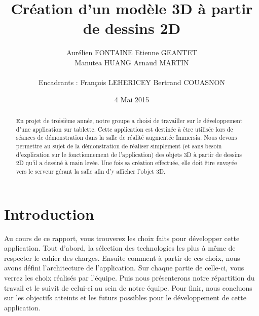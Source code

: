 \documentclass[a4paper,11pt]{article}
\title{ \textbf{Création d'un modèle 3D à partir de dessins 2D} }
\author{ Aurélien \textsc{FONTAINE} Etienne \textsc{GEANTET} \\
	Manutea \textsc{HUANG} Arnaud \textsc{MARTIN} \\
	\\
	Encadrants : François \textsc{LEHERICEY}	Bertrand \textsc{COUASNON}}
\date{4 Mai 2015}                    %
\begin{document}
\maketitle                 %
\thispagestyle{empty}      %

\begin{abstract}
	En projet de troisième année, notre groupe a choisi de travailler sur le développement d'une application sur tablette. Cette application est destinée à être utilisée lors de séances de démonstration dans la salle de réalité augmentée Immersia. Nous devons permettre au sujet de la démonstration de réaliser simplement (et sans besoin d'explication sur le fonctionnement de l'application) des objets 3D à partir de dessins 2D qu'il a dessiné à main levée. Une fois sa création effectuée, elle doit être envoyée vers le serveur gérant la salle afin d'y afficher l'objet 3D.
\end{abstract}
	
	\section{Introduction} %
		Au cours de ce rapport, vous trouverez les choix faits pour développer cette application. Tout d'abord, la sélection des technologies les plus à même de respecter le cahier des charges. Ensuite comment à partir de ces choix, nous avons défini l'architecture de l'application. Sur chaque partie de celle-ci, vous verrez les choix réalisés par l'équipe. Puis nous présenterons notre répartition du travail et le suivit de celui-ci au sein de notre équipe. Pour finir, nous concluons sur les objectifs atteints et les futurs possibles pour le développement de cette application.
\end{document}

